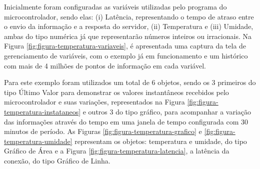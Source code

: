     	\begin{figure}[!h]
		
    	\end{figure}
    	
\newpage
    	
Inicialmente foram configuradas as variáveis utilizadas pelo programa do microcontrolador, sendo elas: (i) Latência, representando o tempo de atraso entre o envio da informação e a resposta do servidor, (ii) Temperatura e (iii) Umidade, ambas do tipo numérica já que representarão números inteiros ou irracionais. Na Figura \ref{fig:figura-temperatura-variaveis}, é apresentada uma captura da tela de gerenciamento de variáveis, com o exemplo já em funcionamento e um histórico com mais de 4 milhões de pontos de informação em cada variável.

        \begin{figure}[!h]
    	\end{figure}
    	
Para este exemplo foram utilizados um total de 6 objetos, sendo os 3 primeiros do tipo Último Valor para demonstrar os valores instantâneos recebidos pelo microcontrolador e suas variações, representados na Figura \ref{fig:figura-temperatura-instataneos} e outros 3 do tipo gráfico, para acompanhar a variação das informações através do tempo em uma janela de tempo configurada com 30 minutos de período. As Figuras \ref{fig:figura-temperatura-grafico} e  \ref{fig:figura-temperatura-umidade} representam os objetos: temperatura e umidade, do tipo Gráfico de Área e a Figura \ref{fig:figura-temperatura-latencia}, a latência da conexão, do tipo Gráfico de Linha.

